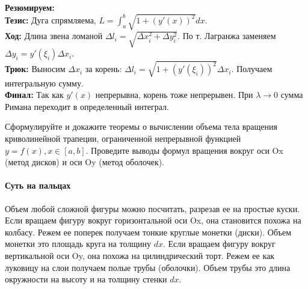 \begin{tcolorbox}[colback=gray!5, colframe=black, boxrule=0.5pt, arc=0pt]
\textbf{Резюмируем:} \\
\textbf{Тезис:} Дуга спрямляема, $L = \int_a^b \sqrt{1 + (y'(x))^2} dx$. \\
\textbf{Ход:} Длина звена ломаной $\Delta l_i = \sqrt{\Delta x_i^2 + \Delta y_i^2}$. По т. Лагранжа заменяем $\Delta y_i = y'(\xi_i) \Delta x_i$. \\
\textbf{Трюк:} Выносим $\Delta x_i$ за корень: $\Delta l_i = \sqrt{1 + (y'(\xi_i))^2} \Delta x_i$. Получаем интегральную сумму. \\
\textbf{Финал:} Так как $y'(x)$ непрерывна, корень тоже непрерывен. При $\lambda \to 0$ сумма Римана переходит в определенный интеграл.
\end{tcolorbox}




{Сформулируйте и докажите теоремы о вычислении объема тела вращения криволинейной трапеции, ограниченной непрерывной функцией $y = f(x), x \in [a, b]$. Проведите выводы формул вращения вокруг оси Ox (метод дисков) и оси Oy (метод оболочек).}

\paragraph{Суть на пальцах}
Объем любой сложной фигуры можно посчитать, разрезав ее на простые куски. 
Если вращаем фигуру вокруг горизонтальной оси Ox, она становится похожа на колбасу. Режем ее поперек получаем тонкие круглые монетки (диски). Объем монетки это площадь круга на толщину $dx$.
Если вращаем фигуру вокруг вертикальной оси Oy, она похожа на цилиндрический торт. Режем ее как луковицу на слои получаем полые трубы (оболочки). Объем трубы это длина окружности на высоту и на толщину стенки $dx$.

